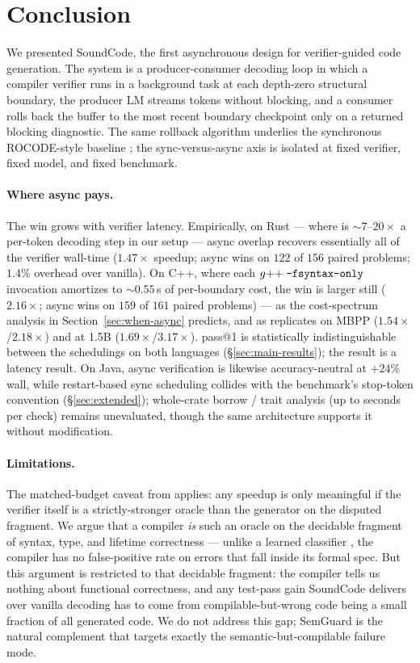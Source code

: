 \section{Conclusion}\label{sec:conclusion}

We presented SoundCode, the first asynchronous design for
verifier-guided code generation. The system is a producer-consumer
decoding loop in which a compiler verifier runs in a
background task at each depth-zero structural boundary, the producer
LM streams tokens without blocking, and a consumer rolls back the
buffer to the most recent boundary checkpoint only on a returned
blocking diagnostic. The same rollback algorithm underlies the
synchronous ROCODE-style baseline \citep{jiang2024rocode}; the
sync-versus-async axis is isolated at fixed verifier, fixed model,
and fixed benchmark.

\paragraph{Where async pays.}
The win grows with verifier latency. Empirically, on Rust ---
where  is $\sim$$7$--$20\times$ a per-token
decoding step in our setup --- async overlap recovers essentially
all of the verifier
wall-time ($1.47\times$ speedup; async wins on $122$ of $156$
paired problems; $1.4\%$ overhead over vanilla). On C++, where each
$g{+}{+}\;\texttt{-fsyntax-only}$ invocation amortizes to
$\sim$$0.55$\,s of per-boundary cost, the win is
larger still ($2.16\times$; async wins on $159$ of $161$ paired
problems) --- as the cost-spectrum analysis in
Section~\ref{sec:when-async} predicts, and as replicates on MBPP
($1.54\times$/$2.18\times$) and at 1.5B
($1.69\times$/$3.17\times$). pass@1 is statistically
indistinguishable between the schedulings on both languages
(\S\ref{sec:main-results}); the result is a latency result. On
Java, async verification is likewise accuracy-neutral at $+24\%$
wall, while restart-based sync scheduling collides with the
benchmark's stop-token convention (\S\ref{sec:extended});
whole-crate borrow / trait analysis (up to seconds per check)
remains unevaluated, though the same architecture supports it
without modification.

\paragraph{Limitations.}
The matched-budget caveat from \citet{olausson2024selfrepair}
applies: any speedup is only meaningful if the verifier itself is a
strictly-stronger oracle than the generator on the disputed
fragment. We argue that a compiler \emph{is} such an oracle on the
decidable fragment of syntax, type, and lifetime correctness ---
unlike a learned classifier \citep{wang2025semguard}, the compiler
has no false-positive rate on errors that fall inside its formal
spec. But this argument is restricted to that decidable fragment:
the compiler tells us nothing about functional correctness, and any
test-pass gain SoundCode delivers over vanilla decoding has to come
from compilable-but-wrong code being a small fraction of all
generated code. We do not address this gap; SemGuard
\citep{wang2025semguard} is the natural complement that targets
exactly the semantic-but-compilable failure mode.

